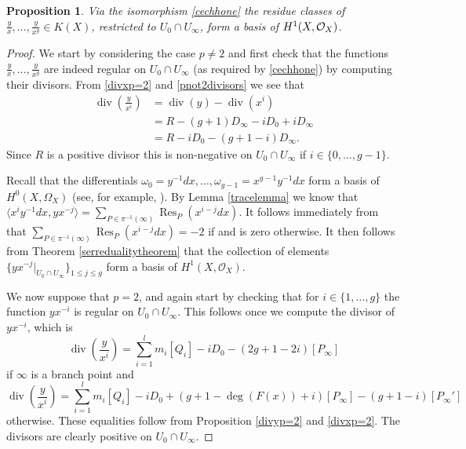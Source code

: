 \documentclass[draft, 11pt]{article} %
\theoremstyle{plain}
\newtheorem{prop}[defn]{Proposition}
\theoremstyle{remark}
\newcommand{\cO}{{\cal O}}
\newcommand{\hzero}{{H^0(X,\Omega_X)}}
\newcommand{\hone}{H^1(X,\mathcal{O}_X)}
\DeclareMathOperator{\res}{Res}
\DeclareMathOperator{\di}{div}
\begin{document}
\begin{prop}\label{basish1}
 Via the isomorphism \eqref{cechhone} the residue classes of $\frac{y}{x}, \ldots , \frac{y}{x^g} \in K(X)$, restricted to $U_0 \cap U_\infty$, form a basis of $H^1(X,\cO_X)$.
\end{prop}
\begin{proof}
We start by considering the case $p \neq 2$ and first check that the functions $\frac{y}{x}, \ldots, \frac{y}{x^g}$ are indeed regular on $U_0 \cap U_\infty$ (as required by \eqref{cechhone}) by computing their divisors.
From \eqref{divxp=2} and \eqref{pnot2divisors} we see that
\begin{align}\label{divisorofyoverx}
\di \left( \frac{y}{x^i} \right) & = \di (y) - \di ( x^i) \nonumber \\
& = R - (g+1)D_\infty - iD_0 + iD_\infty \nonumber \\
& = R - iD_0 - (g+1 - i)D_\infty.
\end{align}
Since $R$ is a positive divisor this is non-negative on $U_0 \cap U_\infty$ if $i\in \{0, \ldots, g-1\}$.


Recall that the differentials $\omega_0 = y^{-1}dx, \ldots, \omega_{g-1} = x^{g-1}y^{-1}dx$ form a basis of $\hzero$ (see, for example, \cite[Chap 7, Prop. 4.26]{liu}).
By Lemma \ref{tracelemma} we know that $\langle x^iy^{-1}dx, yx^{-j} \rangle = \sum_{P \in \pi^{-1}(\infty)}\res_P(x^{i-j}dx)$.
It follows immediately from \cite[Chap. III, Thm. 7.14.1(b)]{hart} that $\sum_{P \in \pi^{-1}(\infty)}\res_P(x^{i-j}dx) = -2$ if and is zero otherwise.
It then follows from Theorem \ref{serredualitytheorem} that the collection of elements $\{ yx^{-j}|_{U_0\cap U_\infty}\}_{ 1 \leq j \leq g}$ form a basis of $\hone$.



We now suppose that $p=2$, and again start by checking that for $i \in \{1, \ldots , g\}$ the function $yx^{-i}$ is regular on $U_0 \cap U_\infty$.
This follows once we compute the divisor of $yx^{-i}$, which is
\begin{equation*}
\di \left( \frac{y}{x^i} \right)  =  
{\displaystyle \sum_{i=1}^l} m_i[Q_i] -iD_0 -(2g+1 - 2i)[P_\infty]
\end{equation*}
if $\infty$ is a branch point and
\begin{equation*}
\di \left( \frac{y}{x^i} \right)  =  
{\displaystyle \sum_{i=1}^l} m_i[Q_i] - iD_0 +(g+1-\deg(F(x)) + i)[P_\infty] - (g+1-i)[P_\infty']
\end{equation*}
otherwise.
These equalities follow from Proposition \ref{divyp=2} and \eqref{divxp=2}.
The divisors are clearly positive on $U_0 \cap U_\infty$.


\end{proof}
\end{document}
